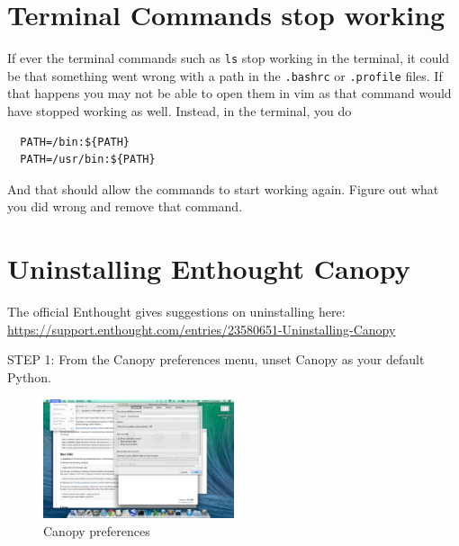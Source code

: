 \documentclass[letterpaper,10pt]{article}
\begin{document}
\section{Terminal Commands stop working}

If ever the terminal commands such as \verb"ls" stop working in the terminal, it could be that something went wrong with a path in the \verb".bashrc" or \verb".profile" files. If that happens you may not be able to open them in vim as that command would have stopped working as well. Instead, in the terminal, you do

\begin{verbatim}
  PATH=/bin:${PATH}
  PATH=/usr/bin:${PATH}
\end{verbatim}

And that should allow the commands to start working again. Figure out what you did wrong and remove that command. 



\section{Uninstalling Enthought Canopy}

The official Enthought gives suggestions on uninstalling here: \url{https://support.enthought.com/entries/23580651-Uninstalling-Canopy}

STEP 1: From the Canopy preferences menu, unset Canopy as your default Python.

\begin{figure}[h!]
  \centering
  \includegraphics[width=0.5\textwidth]{images/canopy_preferences}
  \caption{Canopy preferences}
  \label{fig:canopy_preferences}
\end{figure}
\end{document}

